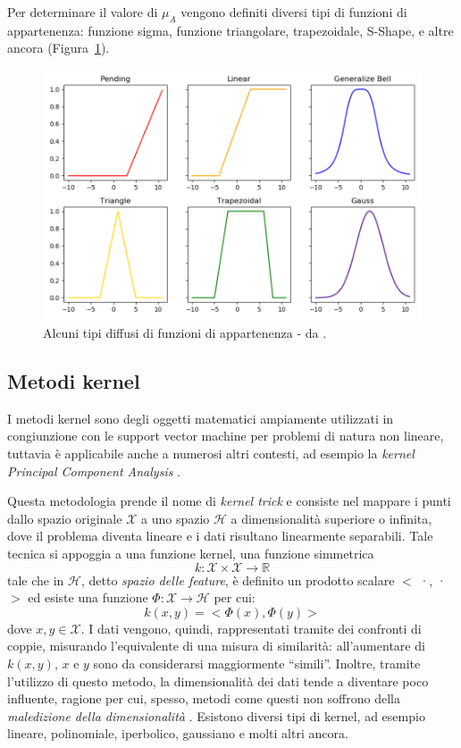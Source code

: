 \documentclass[12pt]{report}
\theoremstyle{definition}
\begin{document}
Per determinare il valore di $\mu_A$ vengono definiti diversi tipi di funzioni di appartenenza: funzione sigma, funzione triangolare, trapezoidale, S-Shape, e altre ancora (Figura~\ref{membership_functions}). 
\begin{figure}
    \centering
    \includegraphics[scale = 0.7]{images/membership_functions.png}
    \caption{Alcuni tipi diffusi di funzioni di appartenenza - da \cite{30}.}
    \label{membership_functions}
\end{figure}
\subsection{Metodi kernel} \label{kernel}
I metodi kernel sono degli oggetti matematici ampiamente utilizzati in congiunzione con le support vector machine \cite{28} per problemi di natura non lineare, tuttavia è applicabile anche a numerosi altri contesti, ad esempio la \textit{kernel Principal Component Analysis} \cite{29}.

Questa metodologia prende il nome di \textit{kernel trick} e consiste nel mappare i punti dallo spazio originale $\mathcal X$ a uno spazio $\mathcal H$ a dimensionalità superiore o infinita, dove il problema diventa lineare e i dati risultano linearmente separabili.
Tale tecnica si appoggia a una funzione kernel, una funzione simmetrica 
\begin{equation}
    k: \mathcal{X} \times \mathcal{X} \rightarrow \mathbb{R}
\end{equation} 
tale che in $\mathcal{H}$, detto \textit{spazio delle feature}, è definito un prodotto scalare $<$ ·, · $>$ ed esiste una funzione $\mathit{\Phi }: \mathcal{X} \rightarrow \mathcal{H}$ per cui:
\begin{equation}
    k(x,y) = <\mathit{\Phi}(x), \mathit{\Phi}(y)>
\end{equation}
dove $x,y \in \mathcal{X}$.
I dati vengono, quindi, rappresentati tramite dei confronti di coppie, misurando l'equivalente di una misura di similarità: all'aumentare di $k(x,y)$, $x$ e $y$ sono da considerarsi maggiormente  ``simili''.
Inoltre, tramite l'utilizzo di questo metodo, la dimensionalità dei dati tende a diventare poco influente, ragione per cui, spesso, metodi come questi non soffrono della \textit{maledizione della dimensionalità} \cite{39}.
Esistono diversi tipi di kernel, ad esempio lineare, polinomiale, iperbolico, gaussiano e molti altri ancora.
\end{document}
